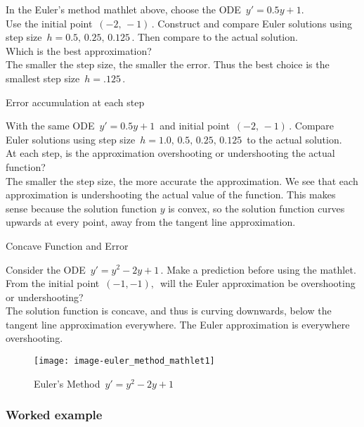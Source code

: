 In the Euler's method mathlet above, choose the ODE $\, y' = 0.5y+1$. \\
Use the initial point $\,(−2, \, −1)\,$. Construct and
compare Euler solutions using step size $\, h= 0.5,\, 0.25,\, 0.125\,$.
Then compare to the actual solution. \\

Which is the best approximation? \\
The smaller the step size, the smaller the error.
Thus the best choice is the smallest step size $\, h =.125 \,$.

\begin{exercise}
  Error accumulation at each step
\end{exercise}

With the same ODE $\, y' = 0.5y+1 \,$ and initial point $\, (−2,\, −1)\,$.
Compare Euler solutions using step size $\, h = 1.0,\, 0.5,\, 0.25,\, 0.125\, $ to the actual solution.\\

At each step, is the approximation overshooting or undershooting the actual function? \\
The smaller the step size, the more accurate the approximation.
We see that each approximation is undershooting the actual value of the function.
This makes sense because the solution function $y$ is convex,
so the solution function curves upwards at every point, away from the tangent line approximation.

\clearpage

\begin{exercise}
  Concave Function and Error
\end{exercise}

Consider the ODE $\, y' = y^2 - 2y +1\,$. Make a prediction before using the mathlet.
From the initial point $\, (−1,  −1),\,$ will the Euler approximation be overshooting or undershooting?\\

The solution function is concave, and thus is curving downwards,
below the tangent line approximation everywhere.
The Euler approximation is everywhere overshooting.

\begin{figure}[ht!]
  \centering
  \texttt{[image: image-euler\_method\_mathlet1]}
  \caption{Euler's Method $\, y' = y^2 - 2y +1\,$}
\end{figure}

\clearpage

\subsubsection{Worked example}


